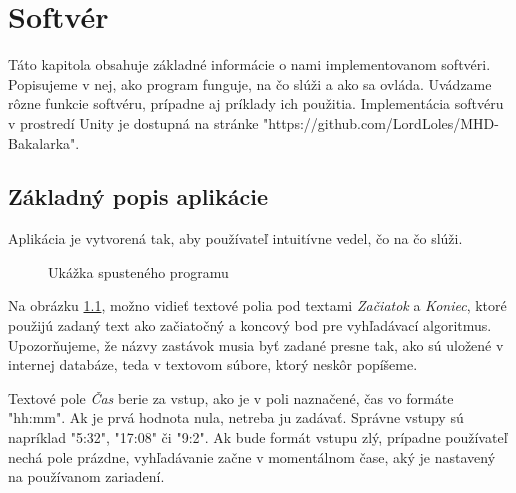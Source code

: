 \chapter{Softvér}
\label{kap:softver}

Táto kapitola obsahuje základné informácie o nami implementovanom softvéri. Popisujeme v nej, ako program funguje, na čo slúži a ako sa ovláda. Uvádzame rôzne funkcie softvéru, prípadne aj príklady ich použitia. Implementácia softvéru v prostredí Unity je dostupná na stránke "https://github.com/LordLoles/MHD-Bakalarka".


\section{Základný popis aplikácie}

Aplikácia je vytvorená tak, aby používateľ intuitívne vedel, čo na čo slúži.\newline

\begin{figure}[H]
  \caption{Ukážka spusteného programu}
  \label{ukazka_programu1}
\end{figure}

Na obrázku \ref{ukazka_programu1}, možno vidieť textové polia pod textami \textit{Začiatok} a \textit{Koniec}, ktoré použijú zadaný text ako začiatočný a koncový bod pre vyhľadávací algoritmus. Upozorňujeme, že názvy zastávok musia byť zadané presne tak, ako sú uložené v internej databáze, teda v textovom súbore, ktorý neskôr popíšeme.\newline

Textové pole \textit{Čas} berie za vstup, ako je v poli naznačené, čas vo formáte "hh:mm". Ak je prvá hodnota nula, netreba ju zadávať. Správne vstupy sú napríklad "5:32", "17:08"  či "9:2". Ak bude formát vstupu zlý, prípadne používateľ nechá pole prázdne, vyhľadávanie začne v momentálnom čase, aký je nastavený na používanom zariadení.\newline

